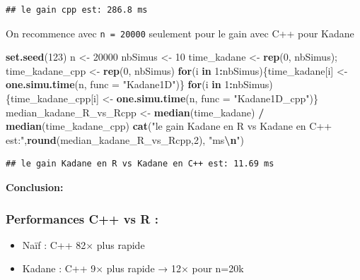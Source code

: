 \documentclass[
]{article}
\newenvironment{Shaded}{\begin{snugshade}}{\end{snugshade}}
\newcommand{\AttributeTok}[1]{\textcolor[rgb]{0.13,0.29,0.53}{#1}}
\newcommand{\ControlFlowTok}[1]{\textcolor[rgb]{0.13,0.29,0.53}{\textbf{#1}}}
\newcommand{\DecValTok}[1]{\textcolor[rgb]{0.00,0.00,0.81}{#1}}
\newcommand{\FunctionTok}[1]{\textcolor[rgb]{0.13,0.29,0.53}{\textbf{#1}}}
\newcommand{\NormalTok}[1]{#1}
\newcommand{\OtherTok}[1]{\textcolor[rgb]{0.56,0.35,0.01}{#1}}
\newcommand{\SpecialCharTok}[1]{\textcolor[rgb]{0.81,0.36,0.00}{\textbf{#1}}}
\newcommand{\StringTok}[1]{\textcolor[rgb]{0.31,0.60,0.02}{#1}}
\providecommand{\tightlist}{%
  \setlength{\itemsep}{0pt}\setlength{\parskip}{0pt}}
\begin{document}
\begin{verbatim}
## le gain cpp est: 286.8 ms
\end{verbatim}

On recommence avec \texttt{n\ =\ 20000} seulement pour le gain avec C++
pour Kadane

\begin{Shaded}
\begin{Highlighting}[]
\FunctionTok{set.seed}\NormalTok{(}\DecValTok{123}\NormalTok{)}
\NormalTok{n }\OtherTok{\textless{}{-}} \DecValTok{20000}
\NormalTok{nbSimus }\OtherTok{\textless{}{-}} \DecValTok{10}
\NormalTok{time\_kadane }\OtherTok{\textless{}{-}} \FunctionTok{rep}\NormalTok{(}\DecValTok{0}\NormalTok{, nbSimus); time\_kadane\_cpp }\OtherTok{\textless{}{-}} \FunctionTok{rep}\NormalTok{(}\DecValTok{0}\NormalTok{, nbSimus)}
\ControlFlowTok{for}\NormalTok{(i }\ControlFlowTok{in} \DecValTok{1}\SpecialCharTok{:}\NormalTok{nbSimus)\{time\_kadane[i] }\OtherTok{\textless{}{-}} \FunctionTok{one.simu.time}\NormalTok{(n, }\AttributeTok{func =} \StringTok{"Kadane1D"}\NormalTok{)\}}
\ControlFlowTok{for}\NormalTok{(i }\ControlFlowTok{in} \DecValTok{1}\SpecialCharTok{:}\NormalTok{nbSimus)\{time\_kadane\_cpp[i] }\OtherTok{\textless{}{-}} \FunctionTok{one.simu.time}\NormalTok{(n, }\AttributeTok{func =} \StringTok{"Kadane1D\_cpp"}\NormalTok{)\}}
\NormalTok{median\_kadane\_R\_vs\_Rcpp }\OtherTok{\textless{}{-}} \FunctionTok{median}\NormalTok{(time\_kadane) }\SpecialCharTok{/} \FunctionTok{median}\NormalTok{(time\_kadane\_cpp)}
\FunctionTok{cat}\NormalTok{(}\StringTok{"le gain Kadane en R vs Kadane en C++ est:"}\NormalTok{,}\FunctionTok{round}\NormalTok{(median\_kadane\_R\_vs\_Rcpp,}\DecValTok{2}\NormalTok{), }\StringTok{"ms}\SpecialCharTok{\textbackslash{}n}\StringTok{"}\NormalTok{)}
\end{Highlighting}
\end{Shaded}

\begin{verbatim}
## le gain Kadane en R vs Kadane en C++ est: 11.69 ms
\end{verbatim}

\textbf{Conclusion:}

\subsubsection{Performances C++ vs R :}\label{performances-c-vs-r}

\begin{itemize}
\tightlist
\item
  Naïf : C++ 82× plus rapide\\
\item
  Kadane : C++ 9× plus rapide → 12× pour n=20k
\end{itemize}
\end{document}
